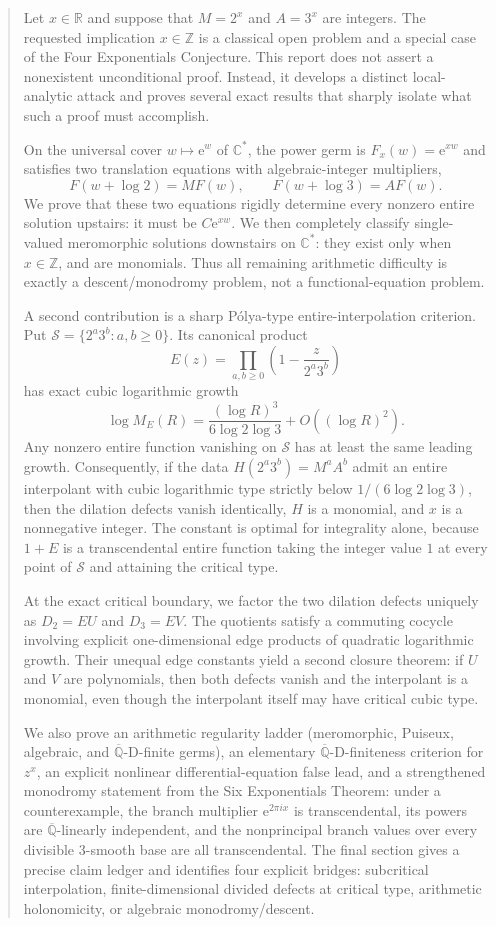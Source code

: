\documentclass[11pt,oneside]{article}
\theoremstyle{definition}
\theoremstyle{remark}
\newcommand{\Z}{\mathbb Z}
\newcommand{\R}{\mathbb R}
\newcommand{\C}{\mathbb C}
\newcommand{\Qbar}{\overline{\mathbb Q}}
\newcommand{\e}{\mathrm e}
\begin{document}
\begin{abstract}
Let \(x\in\R\) and suppose that \(M=2^x\) and \(A=3^x\) are integers.  The requested implication \(x\in\Z\) is a classical open problem and a special case of the Four Exponentials Conjecture.  This report does not assert a nonexistent unconditional proof.  Instead, it develops a distinct local-analytic attack and proves several exact results that sharply isolate what such a proof must accomplish.

On the universal cover \(w\mapsto \e^w\) of \(\C^*\), the power germ is \(F_x(w)=\e^{xw}\) and satisfies two translation equations with algebraic-integer multipliers,
\[
F(w+\log2)=M F(w),\qquad F(w+\log3)=A F(w).
\]
We prove that these two equations rigidly determine every nonzero entire solution upstairs: it must be \(C\e^{xw}\).  We then completely classify single-valued meromorphic solutions downstairs on \(\C^*\): they exist only when \(x\in\Z\), and are monomials.  Thus all remaining arithmetic difficulty is exactly a descent/monodromy problem, not a functional-equation problem.

A second contribution is a sharp P\'olya-type entire-interpolation criterion.  Put
\(\mathcal S=\{2^a3^b:a,b\ge0\}\).  Its canonical product
\[
E(z)=\prod_{a,b\ge0}\left(1-\frac{z}{2^a3^b}\right)
\]
has exact cubic logarithmic growth
\[
\log M_E(R)=\frac{(\log R)^3}{6\log2\log3}+O((\log R)^2).
\]
Any nonzero entire function vanishing on \(\mathcal S\) has at least the same leading growth.  Consequently, if the data
\(H(2^a3^b)=M^aA^b\) admit an entire interpolant with cubic logarithmic type strictly below
\(1/(6\log2\log3)\), then the dilation defects vanish identically, \(H\) is a monomial, and \(x\) is a nonnegative integer.  The constant is optimal for integrality alone, because \(1+E\) is a transcendental entire function taking the integer value \(1\) at every point of \(\mathcal S\) and attaining the critical type.

At the exact critical boundary, we factor the two dilation defects uniquely as \(D_2=EU\) and \(D_3=EV\).  The quotients satisfy a commuting cocycle involving explicit one-dimensional edge products of quadratic logarithmic growth.  Their unequal edge constants yield a second closure theorem: if \(U\) and \(V\) are polynomials, then both defects vanish and the interpolant is a monomial, even though the interpolant itself may have critical cubic type.

We also prove an arithmetic regularity ladder (meromorphic, Puiseux, algebraic, and \(\Qbar\)-D-finite germs), an elementary \(\Qbar\)-D-finiteness criterion for \(z^x\), an explicit nonlinear differential-equation false lead, and a strengthened monodromy statement from the Six Exponentials Theorem: under a counterexample, the branch multiplier \(\e^{2\pi i x}\) is transcendental, its powers are \(\Qbar\)-linearly independent, and the nonprincipal branch values over every divisible \(3\)-smooth base are all transcendental.  The final section gives a precise claim ledger and identifies four explicit bridges: subcritical interpolation, finite-dimensional divided defects at critical type, arithmetic holonomicity, or algebraic monodromy/descent.
\end{abstract}
\end{document}
